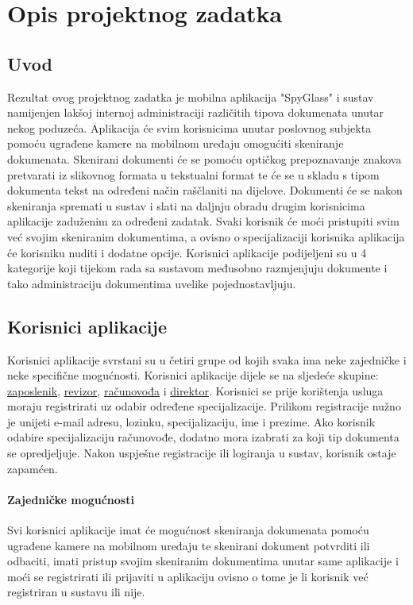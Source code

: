 \chapter{Opis projektnog zadatka}
		
		\section{Uvod}
		
		Rezultat ovog projektnog zadatka je mobilna aplikacija "SpyGlass"  i sustav namijenjen lakšoj internoj administraciji različitih tipova dokumenata unutar nekog poduzeća. Aplikacija će svim korisnicima unutar poslovnog subjekta pomoću ugrađene kamere na mobilnom uređaju omogućiti skeniranje dokumenata. Skenirani dokumenti će se pomoću optičkog prepoznavanje znakova pretvarati iz slikovnog formata u tekstualni format te će se u skladu s tipom dokumenta tekst na određeni način raščlaniti na dijelove. Dokumenti će se nakon skeniranja spremati u sustav i slati na daljnju obradu drugim korisnicima aplikacije zaduženim za određeni zadatak. Svaki korisnik će moći pristupiti svim već svojim skeniranim dokumentima, a ovisno o specijalizaciji korisnika aplikacija će korisniku nuditi i dodatne opcije. Korisnici aplikacije podijeljeni su u 4 kategorije koji tijekom rada sa sustavom međusobno razmjenjuju dokumente i tako administraciju dokumentima uvelike pojednostavljuju.
		
		\section{Korisnici aplikacije}
		Korisnici aplikacije svrstani su u četiri grupe od kojih svaka ima neke zajedničke i neke specifične mogućnosti. Korisnici aplikacije dijele se na sljedeće skupine: \underline{zaposlenik}, \underline{revizor}, \underline{računovođa} i \underline{direktor}. Korisnici se prije korištenja usluga moraju registrirati uz odabir određene specijalizacije. Prilikom registracije nužno je unijeti e-mail adresu, lozinku, specijalizaciju, ime i prezime. Ako korisnik odabire specijalizaciju računovođe, dodatno mora izabrati za koji tip dokumenta se opredjeljuje. Nakon uspješne registracije ili logiranja u sustav, korisnik ostaje zapamćen.

		\subsubsection{Zajedničke mogućnosti}
		Svi korisnici aplikacije imat će mogućnost skeniranja dokumenata pomoću ugrađene kamere na mobilnom uređaju te skenirani dokument potvrditi ili odbaciti, imati pristup svojim skeniranim dokumentima unutar same aplikacije i moći se registrirati ili prijaviti u aplikaciju ovisno o tome je li korisnik već registriran u sustavu ili nije.

